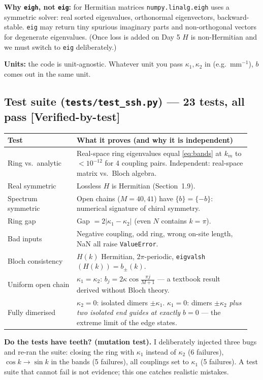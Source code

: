 \documentclass[10pt,a4paper]{article}
\newcommand{\ka}{\kappa_1}
\newcommand{\kc}{\kappa_2}
\newcommand{\evd}[1]{\textsf{\small[#1]}}
\begin{document}
\textbf{Why \texttt{eigh}, not \texttt{eig}:} for Hermitian matrices \texttt{numpy.linalg.eigh} uses a symmetric solver: real sorted eigenvalues, orthonormal eigenvectors, backward-stable. \texttt{eig} may return tiny spurious imaginary parts and non-orthogonal vectors for degenerate eigenvalues. (Once loss is added on Day 5 $H$ is non-Hermitian and we must switch to \texttt{eig} deliberately.)

\textbf{Units:} the code is unit-agnostic. Whatever unit you pass $\ka,\kc$ in (e.g.\ mm$^{-1}$), $b$ comes out in the same unit.

\subsection{Test suite (\texttt{tests/test\_ssh.py}) --- 23 tests, all pass \evd{Verified-by-test}}
\begin{tabular}{@{}p{0.27\linewidth}p{0.68\linewidth}@{}}\toprule
Test & What it proves (and why it is independent)\\\midrule
Ring vs.\ analytic & Real-space ring eigenvalues equal \eqref{eq:bands} at $k_m$ to $<10^{-12}$ for 4 coupling pairs. Independent: real-space matrix vs.\ Bloch algebra.\\
Real symmetric & Lossless $H$ is Hermitian (Section~1.9).\\
Spectrum symmetric & Open chains ($M=40,41$) have $\{b\}=\{-b\}$: numerical signature of chiral symmetry.\\
Ring gap & Gap $=2|\ka-\kc|$ (even $N$ contains $k=\pi$).\\
Bad inputs & Negative coupling, odd ring, wrong on-site length, NaN all raise \texttt{ValueError}.\\
Bloch consistency & $H(k)$ Hermitian, $2\pi$-periodic, \texttt{eigvalsh}$(H(k))=b_\pm(k)$.\\
Uniform open chain & $\ka=\kc$: $b_j=2\kappa\cos\frac{\pi j}{M+1}$ --- a textbook result derived without Bloch theory.\\
Fully dimerised & $\kc=0$: isolated dimers $\pm\ka$. $\ka=0$: dimers $\pm\kc$ \emph{plus two isolated end guides at exactly $b=0$} --- the extreme limit of the edge states.\\\bottomrule
\end{tabular}

\textbf{Do the tests have teeth? (mutation test).} I deliberately injected three bugs and re-ran the suite: closing the ring with $\ka$ instead of $\kc$ (6 failures), $\cos k\to\sin k$ in the bands (5 failures), all couplings set to $\ka$ (5 failures). A test suite that cannot fail is not evidence; this one catches realistic mistakes.
\end{document}
